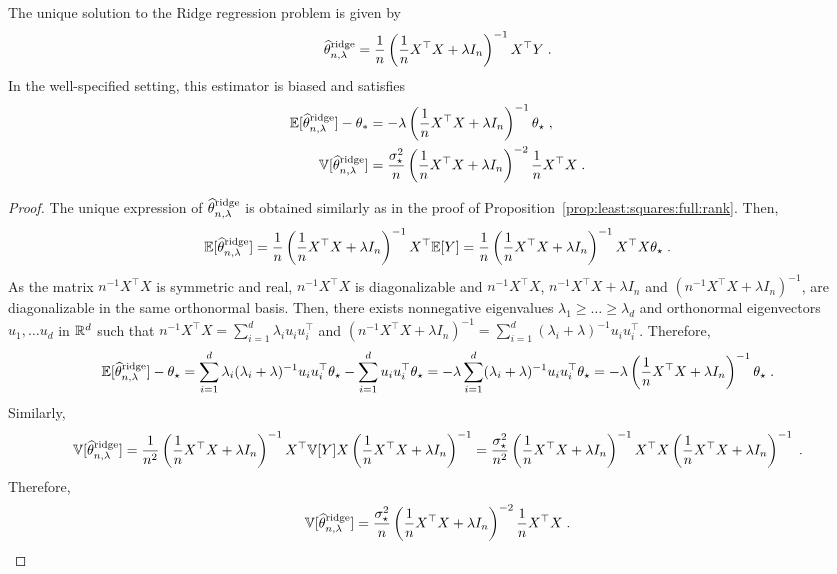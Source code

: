 \begin{shaded}
\begin{proposition}
\label{prop:least:squares:ridge}
The unique solution to the Ridge regression problem is given by
\[
\widehat {\theta}^{\mathrm{ridge}}_{n,\lambda} = \frac{1}{n}\left(\frac{1}{n}X^\top X + \lambda I_n\right)^{-1}X^\top Y\;.
\] 
In the well-specified setting, this estimator is biased and satisfies 
\begin{align*}
\mathbb{E}[\widehat {\theta}^{\mathrm{ridge}}_{n,\lambda} ] - \theta_*&= - \lambda\left(\frac{1}{n}X^\top X + \lambda I_n\right)^{-1}\theta_\star\;,\\
\mathbb{V}[\widehat {\theta}^{\mathrm{ridge}}_{n,\lambda} ] &= \frac{\sigma_\star^{2}}{n}\left(\frac{1}{n}X^\top X + \lambda I_n\right)^{-2}\frac{1}{n}X^\top X\;.
\end{align*}
\end{proposition}
\end{shaded}
\begin{proof}
The unique expression of $\widehat {\theta}^{\mathrm{ridge}}_{n,\lambda} $ is obtained similarly as in the proof of Proposition~\ref{prop:least:squares:full:rank}. Then,
$$
\mathbb{E}[\widehat {\theta}^{\mathrm{ridge}}_{n,\lambda}] =  \frac{1}{n}\left (\frac{1}{n}X^\top X + \lambda  I_n \right)^{-1}X^\top \mathbb{E}[Y] =  \frac{1}{n}\left(\frac{1}{n} X^\top X + \lambda  I_n\right )^{-1}X^\top X\theta_\star \;.
$$
As the matrix $n^{-1}X^\top X$ is symmetric and real,  $ n^{-1}X^\top X$ is diagonalizable and $n^{-1}X^\top X$, $n^{-1}X^\top X + \lambda I_n$ and $(n^{-1} X^\top X + \lambda I_n)^{-1}$, are diagonalizable in the same orthonormal basis. Then, there exists nonnegative eigenvalues $\lambda_1\geqslant \ldots \geqslant \lambda_d$ and orthonormal eigenvectors $u_1, \ldots u_d$ in $\mathbb{R}^d$ such that $n^{-1} X^\top X = \sum_{i=1}^d \lambda_i u_i u_i^\top$ and $(n^{-1}X^\top X + \lambda I_n)^{-1} = \sum_{i=1}^d (\lambda_i + \lambda)^{-1}u_i u_i^\top$. Therefore, 
$$
\mathbb{E}[\widehat {\theta}^{\mathrm{ridge}}_{n,\lambda}] -\theta_\star=  \sum_{i=1}^d \lambda_i(\lambda_i + \lambda)^{-1}u_i u_i^\top\theta_\star -  \sum_{i=1}^d u_i u_i^\top\theta_\star =  - \lambda  \sum_{i=1}^d (\lambda_i + \lambda)^{-1}u_i u_i^\top\theta_\star = - \lambda\left(\frac{1}{n}X^\top X + \lambda I_n\right)^{-1}\theta_\star\;.
$$
Similarly,
$$
\mathbb{V}[\widehat {\theta}^{\mathrm{ridge}}_{n,\lambda}]  =  \frac{1}{n^2}\left(\frac{1}{n}X^\top X + \lambda I_n\right)^{-1}X^\top \mathbb{V}[Y]X  \left(\frac{1}{n}X^\top X + \lambda I_n\right)^{-1} = \frac{\sigma_\star^{2}}{n^2}\left(\frac{1}{n}X^\top X + \lambda I_n\right)^{-1}X^\top X  \left(\frac{1}{n}X^\top X + \lambda I_n\right)^{-1}\;.
$$
Therefore,
$$
\mathbb{V}[\widehat {\theta}^{\mathrm{ridge}}_{n,\lambda}]  =   \frac{\sigma_\star^{2}}{n}\left(\frac{1}{n}X^\top X + \lambda I_n\right)^{-2}\frac{1}{n}X^\top X\;.
$$
\end{proof}


